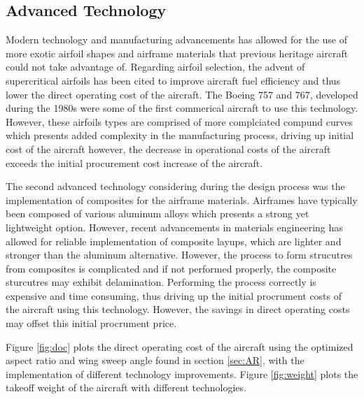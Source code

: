 \documentclass{article}
\begin{document}
    \subsection{Advanced Technology}
    \label{sec:adv_tech}
        \begin{flushleft}
            Modern technology and manufacturing advancements has allowed for the
            use of more exotic airfoil shapes and airframe materials that
            previous heritage aircraft could not take advantage of. Regarding
            airfoil selection, the advent of supercritical airfoils has been
            cited to improve aircraft fuel efficiency and thus lower the direct
            operating cost of the aircraft. The Boeing 757 and 767, developed
            during the 1980s were some of the first commerical aircraft to use
            this technology. However, these airfoils types are comprised of more
            complciated compund curves which presents added complexity in the
            manufacturing process, driving up initial cost of the aircraft
            however, the decrease in operational costs of the aircraft exceeds
            the initial procurement cost increase of the aircraft.

            The second advanced technology considering during the design process
            was the implementation of composites for the airframe materials.
            Airframes have typically been composed of various aluminum alloys
            which presents a strong yet lightweight option. However, recent
            advancements in materials engineering has allowed for reliable
            implementation of composite layups, which are lighter and stronger
            than the aluminum alternative. However, the process to form
            strucutres from composites is complicated and if not performed
            properly, the composite sturcutres may exhibit delamination.
            Performing the process correctly is expensive and time consuming,
            thus driving up the initial procrument costs of the aircraft using
            this technology. However, the savings in direct operating costs may
            offset this initial procrument price.

            Figure \ref{fig:doc} plots the direct operating cost of the aircraft
            using the optimized aspect ratio and wing sweep angle found in
            section \ref{sec:AR}, with the implementation of different
            technology improvements. Figure \ref{fig:weight} plots the takeoff weight of
            the aircraft with different technologies.
        \end{flushleft}
\end{document}
